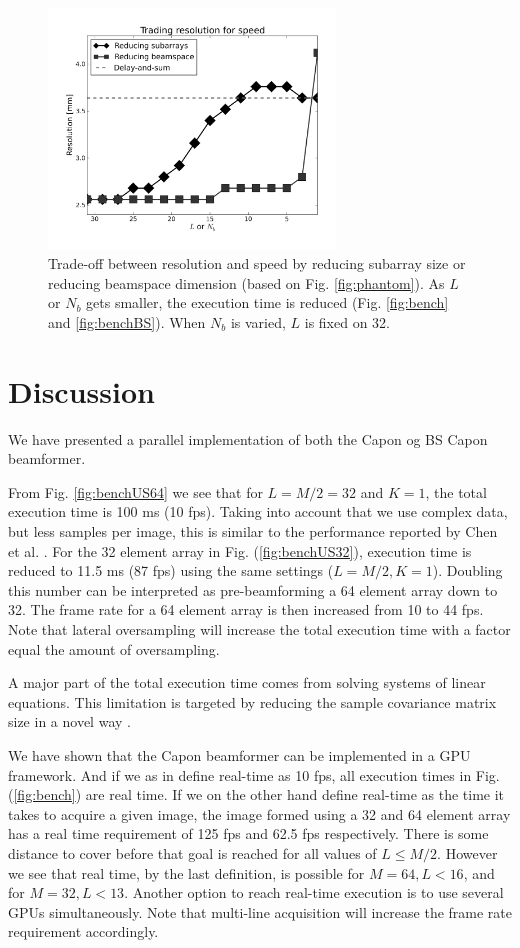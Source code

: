 \documentclass[12pt,journal,onecolumn]{IEEEtran}
\begin{document}
\begin{figure}
\centering
\includegraphics[width=3in]{gfx/speed_res_trade.png}
\caption{Trade-off between resolution and speed by reducing subarray size or reducing beamspace dimension (based on Fig. \ref{fig:phantom}). As $L$ or $N_b$ gets smaller, the execution time is reduced (Fig. \ref{fig:bench} and \ref{fig:benchBS}). When $N_b$ is varied, $L$ is fixed on 32.}
\label{fig:speed_res_trade}
\end{figure}

\section{Discussion}\label{sec:dis}
We have presented a parallel implementation of both the Capon og BS Capon beamformer. 

From Fig. \ref{fig:benchUS64} we see that for $L = M/2 = 32$ and $K=1$, the total execution time is 100 ms (10 fps). Taking into account that we use complex data, but less samples per image, this is similar to the performance reported by Chen et al. \cite{Chen2011}. For the 32 element array in Fig. (\ref{fig:benchUS32}), execution time is reduced to 11.5 ms (87 fps) using the same settings ($L=M/2, K = 1$). Doubling this number can be interpreted as pre-beamforming a 64 element array down to 32. The frame rate for a 64 element array is then increased from 10 to 44 fps. Note that lateral oversampling will increase the total execution time with a factor equal the amount of oversampling.  

A major part of the total execution time comes from solving systems of linear equations. This limitation is targeted by reducing the sample covariance matrix size in a novel way \cite{Nilsen2009}. 

We have shown that the Capon beamformer can be implemented in a GPU framework. And if we as in \cite{Chen2011} define real-time as 10 fps, all execution times  in Fig. (\ref{fig:bench}) are real time. If we on the other hand define real-time as the time it takes to acquire a given image, the image formed using a 32 and 64 element array has a real time requirement of 125 fps and 62.5 fps respectively. There is some distance to cover before that goal is reached for all values of $L \le M/2$. However we see that real time, by the last definition, is possible for $M=64, L < 16$, and for $M = 32, L < 13$. Another option to reach real-time execution is to use several GPUs simultaneously. Note that multi-line acquisition will increase the frame rate requirement accordingly.
 
\end{document}
